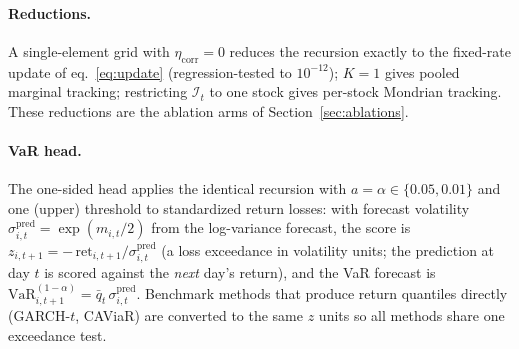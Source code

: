 \paragraph{Reductions.} A single-element grid with
$\eta_{\mathrm{corr}} = 0$ reduces the recursion exactly to the
fixed-rate update of eq.~\eqref{eq:update} (regression-tested to
$10^{-12}$); $K = 1$ gives pooled marginal tracking; restricting
$\mathcal{I}_t$ to one stock gives per-stock Mondrian tracking. These
reductions are the ablation arms of Section~\ref{sec:ablations}.

\paragraph{VaR head.} The one-sided head applies the identical recursion
with $a = \alpha \in \{0.05, 0.01\}$ and one (upper) threshold to
standardized return losses: with forecast volatility
$\sigma^{\mathrm{pred}}_{i,t} = \exp(m_{i,t}/2)$ from the log-variance
forecast, the score is $z_{i,t+1} = -\,\mathrm{ret}_{i,t+1} /
\sigma^{\mathrm{pred}}_{i,t}$ (a loss exceedance in volatility units;
the prediction at day $t$ is scored against the \emph{next} day's
return), and the VaR forecast is
$\mathrm{VaR}^{(1-\alpha)}_{i,t+1} = \bar q_t\,
\sigma^{\mathrm{pred}}_{i,t}$. Benchmark methods that produce return
quantiles directly (GARCH-$t$, CAViaR) are converted to the same $z$
units so all methods share one exceedance test.

